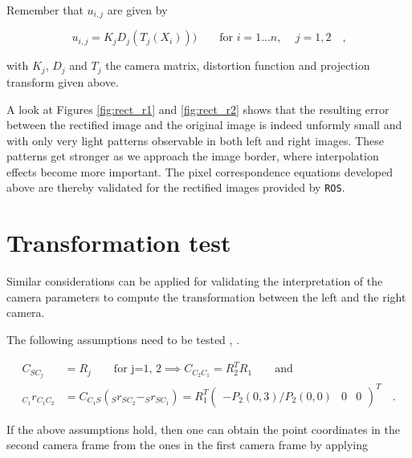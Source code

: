 Remember that $u_{i,j}$ are given by 

\begin{equation}
  u_{i,j} = K_j D_j(T_j(X_i))) 
  \hspace{2em} \text{for } i = 1 \ldots n \text{, } \hspace{1em} j = 1,2
  \hspace{1em}\text{,}
  \label{eqn/rect/u_def}
\end{equation}

with $K_j$, $D_j$ and $T_j$ the camera matrix, distortion function and
projection transform given above.

A look at Figures \ref{fig:rect_r1} and \ref{fig:rect_r2} shows that the resulting error
between the rectified image and the original image is indeed unformly 
small and with only very light patterns observable in both left and right images.
These patterns get stronger as we approach the image border, where interpolation
effects become more important.
The pixel correspondence equations developed above are thereby validated for the 
rectified images provided by \texttt{ROS}.

\section{Transformation test}

Similar considerations can be applied for validating the interpretation of the
camera parameters to compute the transformation between the left and the right
camera.

The following assumptions need to be tested \cite{CameraInfo},
\cite[p. 523f]{Siciliano2007}.

\begin{align}
  C_{SC_j} &= R_j \hspace{2em} \text{for j=1, 2} 
  \implies C_{C_2C_1} = R_2^TR_1 \hspace{2em} \text{and} \\
  _{C_1}r_{C_1C_2} &= C_{C_1 S} (_S{r}_{S C_2} - _S{r}_{S C_1})
   = R_1^T \begin{pmatrix} -P_2(0,3)/P_2(0,0) & 0 & 0
  \end{pmatrix}^T
  \hspace{1em}\text{.}
  \label{rect/eqn:assumptions}
\end{align}

If the above assumptions hold, then one can obtain the point coordinates in the second camera frame from the
ones in the first camera frame by applying

